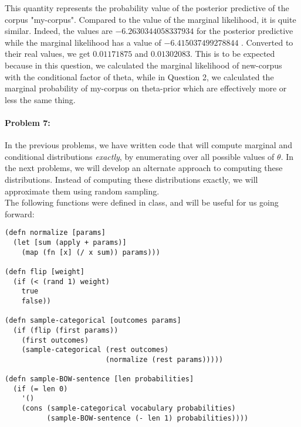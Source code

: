 \documentclass[10pt]{article}
\newenvironment{AnswerBox}{\begin{mdframed}[style=simple]}{\end{mdframed}}
\begin{document}
\begin{AnswerBox}%

This quantity represents the probability value of the posterior predictive of the corpus "my-corpus". Compared to the value of the marginal likelihood, it is quite similar. Indeed, the values are $-6.2630344058337934$ for the posterior predictive while the marginal likelihood has a value of $-6.415037499278844$ . Converted to their real values, we get $0.01171875$ and $0.01302083$. This is to be expected because in this question, we calculated the marginal likelihood of new-corpus with the conditional factor of theta, while in Question 2, we calculated the marginal probability of my-corpus on theta-prior which are effectively more or less the same thing.

    
\end{AnswerBox}%

\hrulefill %

\paragraph{Problem 7:}
In the previous problems, we have written code that will compute
marginal and conditional distributions \emph{exactly}, by enumerating
over all possible values of $\theta$. In the next problems, we will
develop an alternate approach to computing these distributions.
Instead of computing these distributions exactly, we will approximate
them using random sampling.  \\

 The following functions were defined in class, and will be
useful for us going forward:

\begin{lstlisting}
(defn normalize [params]
  (let [sum (apply + params)]
    (map (fn [x] (/ x sum)) params)))

(defn flip [weight]
  (if (< (rand 1) weight)
    true
    false))

(defn sample-categorical [outcomes params]
  (if (flip (first params))
    (first outcomes)
    (sample-categorical (rest outcomes) 
                        (normalize (rest params)))))

(defn sample-BOW-sentence [len probabilities]
  (if (= len 0)
    '()
    (cons (sample-categorical vocabulary probabilities)
          (sample-BOW-sentence (- len 1) probabilities))))
\end{lstlisting}
\end{document}
